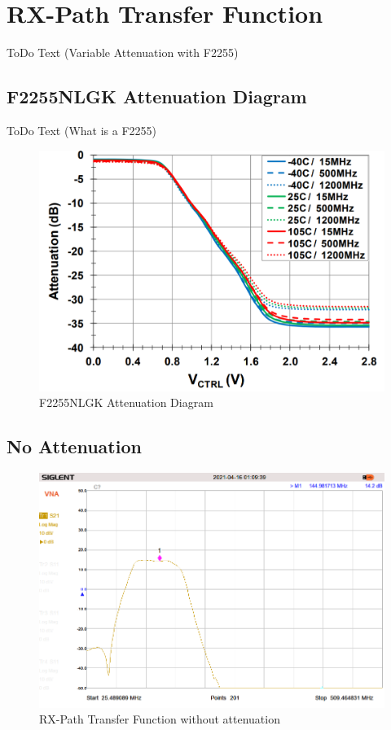 \section{RX-Path Transfer Function}
ToDo Text (Variable Attenuation with F2255)

\subsection{F2255NLGK Attenuation Diagram}
ToDo Text (What is a F2255)

	\begin{figure}[ht!]
		\centering
		\includegraphics[width = 12cm]{./5_measurements/fig/F2255-Diagram}
		\caption{F2255NLGK Attenuation Diagram\protect\footnotemark \cite{f2255nlgk.2020}}
		\label{fig:F2255NLGK Att}
	\end{figure}

	\newpage

\subsection{No Attenuation}
	\begin{figure}[ht!]
		\centering
		\includegraphics[width = 12cm]{./5_measurements/fig/RX-Path-NoAtt}
		\caption{RX-Path Transfer Function without attenuation}
		\label{fig:No Att}
	\end{figure}

